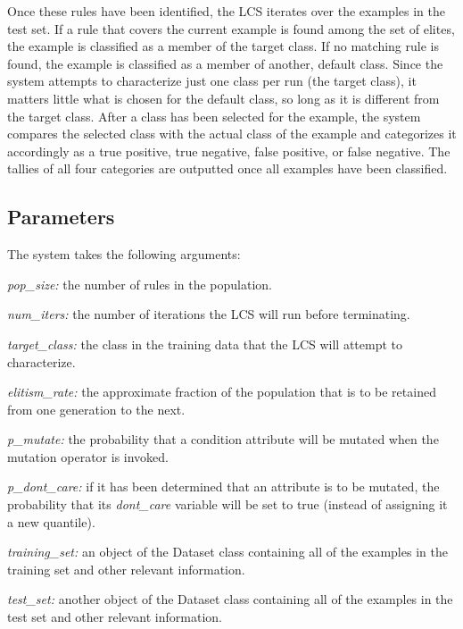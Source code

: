 \documentclass[11pt]{article}
\begin{document}
Once these rules have been identified, the LCS iterates over the examples in the test set. If a rule that covers the current example is found among the set of elites, the example is classified as a member of the target class. If no matching rule is found, the example is classified as a member of another, default class. Since the system attempts to characterize just one class per run (the target class), it matters little what is chosen for the default class, so long as it is different from the target class. After a class has been selected for the example, the system compares the selected class with the actual class of the example and categorizes it accordingly as a true positive, true negative, false positive, or false negative. The tallies of all four categories are outputted once all examples have been classified.

\subsection{Parameters}

The system takes the following arguments:

\begin{description}
\item \textit{pop\_size:} the number of rules in the population.
\item \textit{num\_iters:} the number of iterations the LCS will run before terminating.
\item \textit{target\_class:} the class in the training data that the LCS will attempt to characterize.
\item \textit{elitism\_rate:} the approximate fraction of the population that is to be retained from one generation to the next.
\item \textit{p\_mutate:} the probability that a condition attribute will be mutated when the mutation operator is invoked.
\item \textit{p\_dont\_care:} if it has been determined that an attribute is to be mutated, the probability that its \textit{dont\_care} variable will be set to true (instead of assigning it a new quantile).
\item \textit{training\_set:} an object of the Dataset class containing all of the examples in the training set and other relevant information.
\item \textit{test\_set:} another object of the Dataset class containing all of the examples in the test set and other relevant information.
\end{description}
\end{document}
